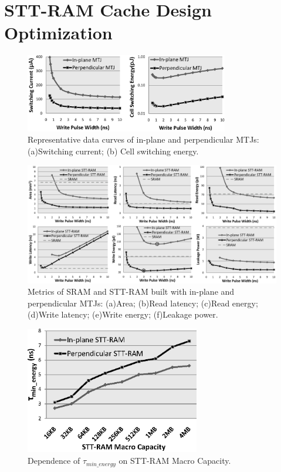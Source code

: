 \section{STT-RAM Cache Design Optimization} \label{sec:opt}

\begin{figure}[t]
  \centering
  \includegraphics[width=3.5in]{fig/MTJSpec.eps}
  \caption{Representative data curves of in-plane and perpendicular MTJs: (a)Switching current; (b) Cell switching energy.}
  \label{fig:specs}
\end{figure}

\begin{figure}[t]
  \centering
  \includegraphics[width=7in]{fig/AllMetrics.eps}
  \caption{Metrics of SRAM and STT-RAM built with in-plane and perpendicular MTJs: (a)Area; (b)Read latency; (c)Read energy; (d)Write latency; (e)Write energy; (f)Leakage power.}
  \label{fig:metrics}
\end{figure}

\begin{figure}[t]
  \centering
  \includegraphics[width=3in]{fig/MinEnergy.eps}
  \caption{Dependence of $\tau_{min\_energy}$ on STT-RAM Macro Capacity.}
  \label{fig:minenergy}
\end{figure}


